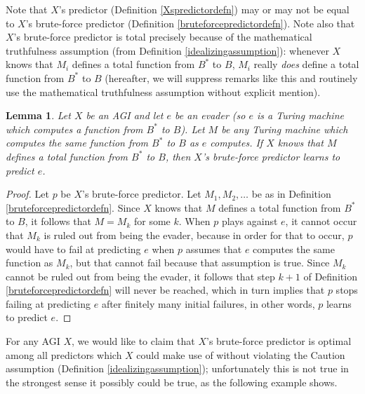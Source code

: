 \documentclass{article}
\newtheorem{lemma}[theorem]{Lemma}
\begin{document}
Note that $X$'s predictor (Definition \ref{Xspredictordefn})
may or may not be equal to $X$'s brute-force predictor
(Definition \ref{bruteforcepredictordefn}). Note also that $X$'s brute-force predictor
is total precisely because of the mathematical truthfulness assumption
(from Definition \ref{idealizingassumption}): whenever $X$ knows that
$M_i$ defines a total function from $B^*$ to $B$, $M_i$ really \emph{does}
define a total function from $B^*$ to $B$ (hereafter, we will suppress
remarks like this and routinely use the mathematical truthfulness assumption
without explicit mention).

\begin{lemma}
\label{knowingimplieslearninglemma}
    Let $X$ be an AGI and let $e$ be an evader (so $e$ is a Turing machine which
    computes a function from $B^*$ to $B$).
    Let $M$ be any Turing machine which computes the same function from $B^*$ to $B$
    as $e$ computes.
    If $X$ knows that $M$ defines a total function from $B^*$ to $B$,
    then $X$'s brute-force predictor learns to predict $e$.
\end{lemma}

\begin{proof}
    Let $p$ be $X$'s brute-force predictor.
    Let $M_1,M_2,\ldots$ be as in Definition \ref{bruteforcepredictordefn}.
    Since $X$ knows that $M$ defines a total
    function from $B^*$ to $B$,
    it follows that $M=M_k$ for some $k$.
    When $p$ plays against $e$, it cannot occur that $M_k$ is ruled out
    from being the evader, because in order for that to occur, $p$ would have
    to fail at predicting $e$ when $p$ assumes that $e$ computes the same
    function as $M_k$, but that cannot fail because that assumption is true.
    Since $M_k$ cannot be ruled out from being the evader, it follows that
    step $k+1$ of Definition \ref{bruteforcepredictordefn} will never be
    reached, which in turn implies that $p$ stops failing at predicting $e$
    after finitely many initial failures, in other words, $p$ learns to
    predict $e$.
\end{proof}

For any AGI $X$, we would like to claim that $X$'s brute-force predictor is
optimal among all predictors which $X$ could make use of without violating the
Caution assumption (Definition \ref{idealizingassumption}); unfortunately this
is not true in the strongest sense it possibly could be true, as the following
example shows.
\end{document}
